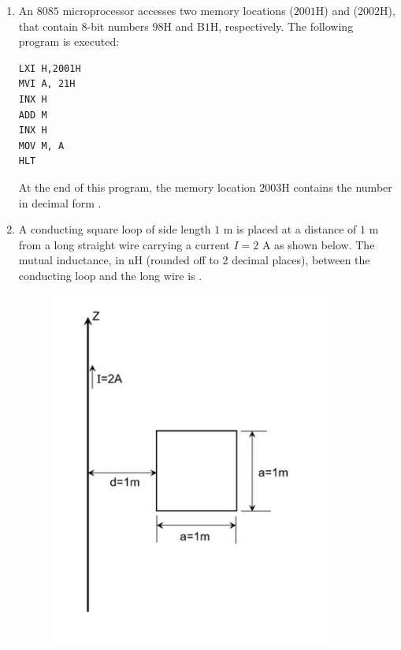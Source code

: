 \documentclass[journal,12pt,onecolumn]{IEEEtran}
\theoremstyle{remark}
\begin{document}
\begin{enumerate}[start=1, label=Q.\arabic*]
    \hfill{}
     \item An $8085$ microprocessor accesses two memory locations ($2001\text{H}$) and ($2002\text{H}$), that contain $8$-bit numbers $98\text{H}$ and B$1\text{H}$, respectively. The following program is executed:
    
    \begin{verbatim}
LXI H,2001H
MVI A, 21H
INX H
ADD M
INX H
MOV M, A
HLT
    \end{verbatim}
    
    At the end of this program, the memory location $2003\text{H}$ contains the number in decimal  form \underline{\hspace{2cm}}.
    
    \hfill{}

    \item A conducting square loop of side length $1$ m is placed at a distance of $1$ m from a long straight wire carrying a current $I = 2$ A as shown below. The mutual inductance, in nH \text(rounded off to  2 decimal places), between the conducting loop and the long wire is \underline{\hspace{2cm}}.
    
    \begin{figure}[H]
        \includegraphics[width=0.4\columnwidth]{Figures/qs68.png}
        \centering
        \caption{}
    \end{figure}
    
    \hfill{}

\end{enumerate}
\end{document}
